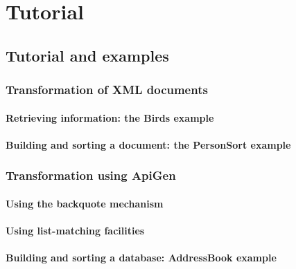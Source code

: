 \part{Tutorial}
\chapter{Tutorial and examples}

\section{Transformation of XML documents}

\subsection{Retrieving information: the Birds example}

\subsection{Building and sorting a document: the PersonSort example}


\section{Transformation using ApiGen}

\subsection{Using the backquote mechanism}

\subsection{Using list-matching facilities}

\subsection{Building and sorting a database: AddressBook example}

